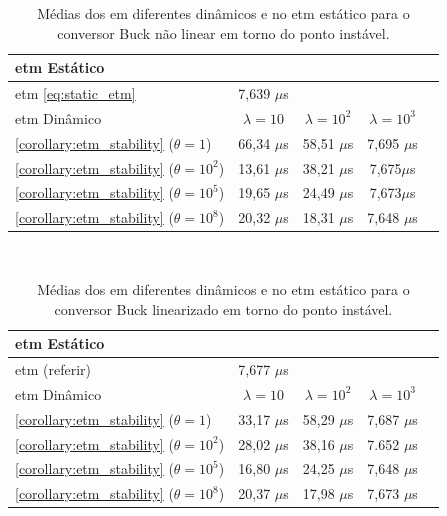 \begin{table}[H]
  \centering
  \setlength{\tabcolsep}{10pt}
  \captionsetup{justification=centering}
  \begin{tabular}{lcccc}
    \toprule
      \acrshort{etm} Estático \\
    \midrule
    \acrshort{etm} \eqref{eq:static_etm} & 7,639 $\mu$s \\
    \bottomrule
    \toprule
    \acrshort{etm} Dinâmico & $\lambda = 10$ & $\lambda = 10^2$ & $\lambda = 10^3$ \\
    \midrule
      \autoref{corollary:etm_stability} ($\theta = 1$) & 66,34 $\mu$s & 58,51 $\mu$s & 7,695 $\mu$s   \\
      \autoref{corollary:etm_stability} ($\theta = 10^2$) & 13,61 $\mu$s & 38,21 $\mu$s & 7,675$\mu$s\\
      \autoref{corollary:etm_stability} ($\theta = 10^5$) & 19,65 $\mu$s & 24,49 $\mu$s & 7,673$\mu$s\\
      \autoref{corollary:etm_stability} ($\theta = 10^8$) & 20,32 $\mu$s & 18,31 $\mu$s & 7,648 $\mu$s\\
    \bottomrule
  \end{tabular} \\[4pt]
  \caption{Médias dos  em diferentes  dinâmicos e no \acrshort{etm} estático \newline para o conversor Buck não linear em torno do ponto instável.}
  \label{table:dynamic_etm_approaches_buck_sl}
\end{table}

\begin{table}[H]
  \centering
  \setlength{\tabcolsep}{10pt}
  \captionsetup{justification=centering}
  \begin{tabular}{lcccc}
    \toprule
      \acrshort{etm} Estático \\
    \midrule
      \acrshort{etm} (referir) & 7,677 $\mu$s \\
    \bottomrule
    \toprule
      \acrshort{etm} Dinâmico & $\lambda = 10$ & $\lambda = 10^2$ & $\lambda = 10^3$ \\
    \midrule
      \autoref{corollary:etm_stability} ($\theta = 1$) & 33,17 $\mu$s & 58,29 $\mu$s & 7,687 $\mu$s \\
      \autoref{corollary:etm_stability} ($\theta = 10^2$) & 28,02 $\mu$s &  38,16 $\mu$s & 7.652  $\mu$s\\
      \autoref{corollary:etm_stability} ($\theta = 10^5$) & 16,80 $\mu$s & 24,25 $\mu$s & 7,648  $\mu$s\\
      \autoref{corollary:etm_stability} ($\theta = 10^8$) & 20,37 $\mu$s & 17,98 $\mu$s & 7,673  $\mu$s\\
    \bottomrule
  \end{tabular} \\[4pt]
  \caption{Médias dos  em diferentes  dinâmicos e no \acrshort{etm} estático \newline para o conversor Buck linearizado em torno do ponto instável.}
  \label{table:dynamic_etm_approaches_buck_snl}
\end{table}


